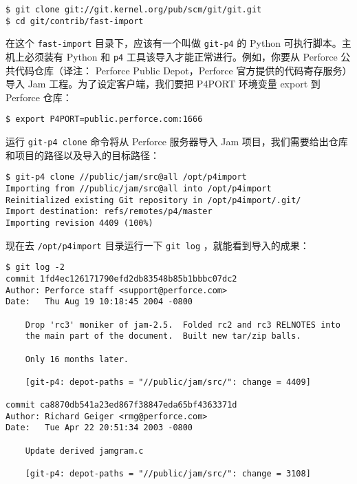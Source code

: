 \documentclass[a4paper]{book}
\begin{document}
\begin{shaded}\begin{verbatim}
$ git clone git://git.kernel.org/pub/scm/git/git.git
$ cd git/contrib/fast-import
\end{verbatim}\end{shaded}

在这个 \texttt{fast-import} 目录下，应该有一个叫做 \texttt{git-p4} 的 Python 可执行脚本。主机上必须装有 Python 和 \texttt{p4} 工具该导入才能正常进行。例如，你要从 Perforce 公共代码仓库（译注： Perforce Public Depot，Perforce 官方提供的代码寄存服务）导入 Jam 工程。为了设定客户端，我们要把 P4PORT 环境变量 export 到 Perforce 仓库：

\begin{shaded}\begin{verbatim}
$ export P4PORT=public.perforce.com:1666
\end{verbatim}\end{shaded}

运行 \texttt{git-p4 clone} 命令将从 Perforce 服务器导入 Jam 项目，我们需要给出仓库和项目的路径以及导入的目标路径：

\begin{shaded}\begin{verbatim}
$ git-p4 clone //public/jam/src@all /opt/p4import
Importing from //public/jam/src@all into /opt/p4import
Reinitialized existing Git repository in /opt/p4import/.git/
Import destination: refs/remotes/p4/master
Importing revision 4409 (100%)
\end{verbatim}\end{shaded}

现在去 \texttt{/opt/p4import} 目录运行一下 \texttt{git log} ，就能看到导入的成果：

\begin{shaded}\begin{verbatim}
$ git log -2
commit 1fd4ec126171790efd2db83548b85b1bbbc07dc2
Author: Perforce staff <support@perforce.com>
Date:   Thu Aug 19 10:18:45 2004 -0800

    Drop 'rc3' moniker of jam-2.5.  Folded rc2 and rc3 RELNOTES into
    the main part of the document.  Built new tar/zip balls.

    Only 16 months later.

    [git-p4: depot-paths = "//public/jam/src/": change = 4409]

commit ca8870db541a23ed867f38847eda65bf4363371d
Author: Richard Geiger <rmg@perforce.com>
Date:   Tue Apr 22 20:51:34 2003 -0800

    Update derived jamgram.c

    [git-p4: depot-paths = "//public/jam/src/": change = 3108]
\end{verbatim}\end{shaded}
\end{document}
